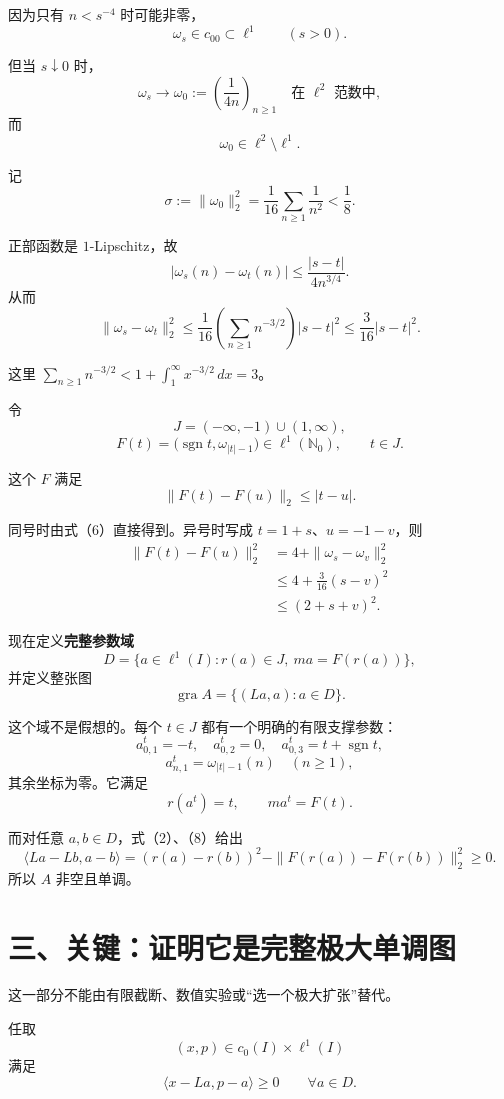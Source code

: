 \documentclass[UTF8,fontset=fandol,11pt,a4paper]{ctexart}
\begin{document}
因为只有 $n<s^{-4}$ 时可能非零， \[
\omega_s\in c_{00}\subset\ell^1
\qquad(s>0).
\]

但当 $s\downarrow0$ 时， \[
\omega_s\longrightarrow
\omega_0:=\left(\frac1{4n}\right)_{n\ge1}
\quad\text{在 }\ell^2\text{ 范数中},
\] 而 \[
\omega_0\in\ell^2\setminus\ell^1.
\tag{5}
\]

记 \[
\sigma:=\|\omega_0\|_2^2
=\frac1{16}\sum_{n\ge1}\frac1{n^2}
<\frac18.
\]

正部函数是 $1$-Lipschitz，故 \[
|\omega_s(n)-\omega_t(n)|
\le\frac{|s-t|}{4n^{3/4}}.
\] 从而 \[
\|\omega_s-\omega_t\|_2^2
\le\frac1{16}
\left(\sum_{n\ge1}n^{-3/2}\right)|s-t|^2
\le\frac3{16}|s-t|^2.
\tag{6}
\]

这里 $\sum_{n\ge1}n^{-3/2}<1+\int_1^\infty x^{-3/2}\,dx=3$。

令 \[
J=(-\infty,-1)\cup(1,\infty),
\] \[
F(t)=\bigl(\operatorname{sgn}t,\omega_{|t|-1}\bigr)
\in\ell^1(\mathbb N_0),
\qquad t\in J.
\tag{7}
\]

这个 $F$ 满足 \[
\|F(t)-F(u)\|_2\le|t-u|.
\tag{8}
\]

同号时由式（6）直接得到。异号时写成 $t=1+s$、$u=-1-v$，则 \[
\begin{aligned}
\|F(t)-F(u)\|_2^2
&=4+\|\omega_s-\omega_v\|_2^2\\
&\le4+\frac3{16}(s-v)^2\\
&\le(2+s+v)^2.
\end{aligned}
\]

现在定义\textbf{完整参数域} \[
D=\{a\in\ell^1(I):r(a)\in J,\ ma=F(r(a))\},
\tag{9}
\] 并定义整张图 \[
\boxed{
\operatorname{gra}A=\{(La,a):a\in D\}.
}
\tag{10}
\]

这个域不是假想的。每个 $t\in J$ 都有一个明确的有限支撑参数： \[
a^t_{0,1}=-t,\quad
a^t_{0,2}=0,\quad
a^t_{0,3}=t+\operatorname{sgn}t,
\] \[
a^t_{n,1}=\omega_{|t|-1}(n)\quad(n\ge1),
\] 其余坐标为零。它满足 \[
r(a^t)=t,\qquad ma^t=F(t).
\]

而对任意 $a,b\in D$，式（2）、（8）给出 \[
\langle La-Lb,a-b\rangle
=(r(a)-r(b))^2
-\|F(r(a))-F(r(b))\|_2^2
\ge0.
\] 所以 $A$ 非空且单调。

\section{三、关键：证明它是完整极大单调图}\label{ux4e09ux5173ux952eux8bc1ux660eux5b83ux662fux5b8cux6574ux6781ux5927ux5355ux8c03ux56fe}

这一部分不能由有限截断、数值实验或``选一个极大扩张''替代。

任取 \[
(x,p)\in c_0(I)\times\ell^1(I)
\] 满足 \[
\langle x-La,p-a\rangle\ge0
\qquad\forall a\in D.
\tag{11}
\]
\end{document}
